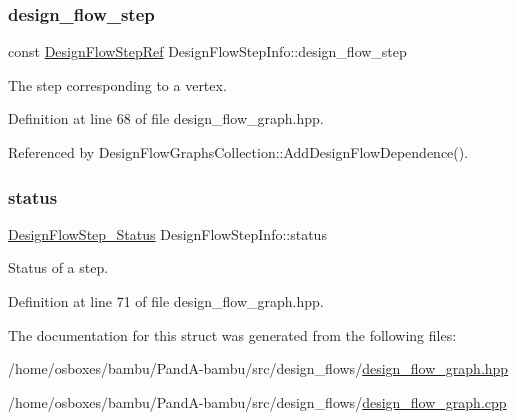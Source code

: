 \subsubsection{\texorpdfstring{design\+\_\+flow\+\_\+step}{design\_flow\_step}}
{\footnotesize\ttfamily const \hyperlink{design__flow__step_8hpp_a9dd6b4474ddf52d41a78b1aaa12ae6c8}{Design\+Flow\+Step\+Ref} Design\+Flow\+Step\+Info\+::design\+\_\+flow\+\_\+step}



The step corresponding to a vertex. 



Definition at line 68 of file design\+\_\+flow\+\_\+graph.\+hpp.



Referenced by Design\+Flow\+Graphs\+Collection\+::\+Add\+Design\+Flow\+Dependence().

\mbox{\label{structDesignFlowStepInfo_a1dd7a1aaa29dbf8356dc2ec0b6611bcc}} 
\subsubsection{\texorpdfstring{status}{status}}
{\footnotesize\ttfamily \hyperlink{design__flow__step_8hpp_afb1f0d73069c26076b8d31dbc8ebecdf}{Design\+Flow\+Step\+\_\+\+Status} Design\+Flow\+Step\+Info\+::status}



Status of a step. 



Definition at line 71 of file design\+\_\+flow\+\_\+graph.\+hpp.



The documentation for this struct was generated from the following files\+:\begin{DoxyCompactItemize}
\item 
/home/osboxes/bambu/\+Pand\+A-\/bambu/src/design\+\_\+flows/\hyperlink{design__flow__graph_8hpp}{design\+\_\+flow\+\_\+graph.\+hpp}\item 
/home/osboxes/bambu/\+Pand\+A-\/bambu/src/design\+\_\+flows/\hyperlink{design__flow__graph_8cpp}{design\+\_\+flow\+\_\+graph.\+cpp}\end{DoxyCompactItemize}
